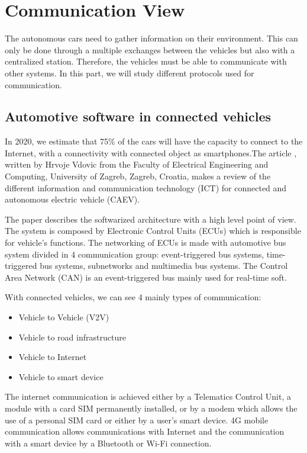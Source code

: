 \section{Communication View}

The autonomous cars need to gather information on their environment. This can only be done through a multiple exchanges between the vehicles but also with a centralized station. Therefore, the vehicles must be able to communicate  with other systems. In this part, we will study different protocols used for communication.

\subsection{Automotive software in connected vehicles}

In 2020, we estimate that 75\% of the cars will have the capacity to connect to the Internet, with a connectivity with connected object as smartphones.The article \cite{connectivity_car}, written by Hrvoje Vdovic from the Faculty of Electrical Engineering and Computing, University of Zagreb, Zagreb, Croatia, makes a review of the different information and communication technology (ICT) for connected and autonomous electric vehicle (CAEV).

The paper describes the softwarized architecture with a high level point of view. The system is composed by Electronic Control Units (ECUs) which is responsible for vehicle’s functions. The networking of ECUs is made with automotive bus system divided in 4 communication group: event-triggered bus systems, time-triggered bus systems, subnetworks and multimedia bus systems. The Control Area Network (CAN) is an event-triggered bus mainly used for real-time soft.

With connected vehicles, we can see 4 mainly types of communication:

\begin{itemize}
    \item Vehicle to Vehicle (V2V)
    \item Vehicle to road infrastructure
    \item Vehicle to Internet
    \item Vehicle to smart device
\end{itemize}

The internet communication is achieved either by a Telematics Control Unit, a module with a card SIM permanently installed, or by a modem which allows the use of a personal SIM card or either by a user’s smart device. 4G mobile communication allows communications with Internet and the communication with a smart device by a Bluetooth or Wi-Fi connection.

